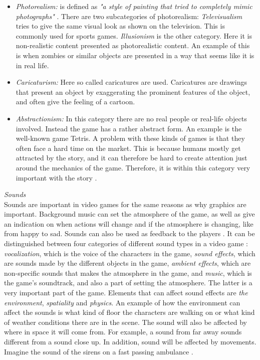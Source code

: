 \begin{itemize}
\item \emph{Photorealism:} is defined as \emph{"a style of painting that tried to completely mimic photographs"} \cite{understandingvg}. There are two subcategories of photorealism: \emph{Televisualism} tries to give the same visual look as shown on the television. This is commonly used for sports games. \emph{Illusionism} is the other category. Here it is non-realistic content presented as photorealistic content. An example of this is when zombies or similar objects are presented in a way that seems like it is in real life.  
\item \emph{Caricaturism:} Here so called caricatures are used. Caricatures are drawings that present an object by exaggerating the prominent features of the object, and often give the feeling of a cartoon. 
\item \emph{Abstractionism:} In this category there are no real people or real-life objects involved. Instead  the game has a rather abstract form. An example is the well-known game Tetris. A problem with these kinds of games is that they often face a hard time on the market. This is because humans mostly get attracted by the story, and it can therefore be hard to create attention just around the mechanics of the game. Therefore, it is within this category very important with the story \cite{understandingvg}. 
\end{itemize}

\emph{Sounds}\\
Sounds are important in video games for the same reasons as why graphics are important. Background music can set the atmosphere of the game, as well as give an indication on when actions will change and if the atmosphere is changing, like from happy to sad. Sounds can also be used as feedback to the players \cite{umlapproach}. It can be distinguished between four categories of different sound types in a video game \cite{understandingvg}:
\emph{vocalization}, which is the voice of the characters in the game,
\emph{sound effects}, which are sounds made by the different objects in the game, \emph{ambient effects}, which are non-specific sounds that makes the atmosphere in the game, and \emph{music}, which is the game's soundtrack, and also a part of setting the atmosphere. The latter is a very important part of the game. Elements that can affect sound effects are \emph{the environment}, \emph{spatiality} and \emph{physics}. An example of how the environment can affect the sounds is what kind of floor the characters are walking on or what kind of weather conditions there are in the scene. The sound will also be affected by where in space it will come from. For example, a sound from far away sounds different from a sound close up. In addition, sound will be affected by movements. Imagine the sound of the sirens on a fast passing ambulance \cite{understandingvg}.


